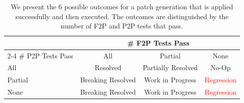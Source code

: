 
\begin{table}[ht]
    \centering
    \begin{tabular}{l|ccc}
    \toprule
            & \multicolumn{3}{c}{\# F2P Tests Pass} \\
    \cmidrule(lr){2-4} 
    \# P2P Tests Pass & All               & Partial            & None \\
    \midrule
        All & \textcolor{green1}{Resolved} & \textcolor{green3}{Partially Resolved} & No-Op  \\
    Partial & \textcolor{green2}{Breaking Resolved} & \textcolor{green4}{Work in Progress} & \textcolor{red}{Regression} \\
       None & \textcolor{green2}{Breaking Resolved} & \textcolor{green4}{Work in Progress} & \textcolor{red}{Regression} \\
    \bottomrule
    \end{tabular}
    \caption{We present the 6 possible outcomes for a patch generation that is applied successfully and then executed. The outcomes are distinguished by the number of F2P and P2P tests that pass.}
    \label{table:six-outcome-cases}
\end{table}
